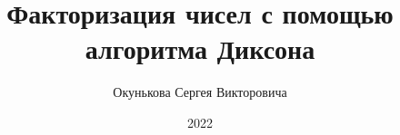 \documentclass[spec, och, labwork]{shiza}
\begin{document}
\chair{}

\title{Факторизация чисел с помощью алгоритма Диксона}






\author{Окунькова Сергея Викторовича}








\date{2022}

\maketitle

\end{document}
